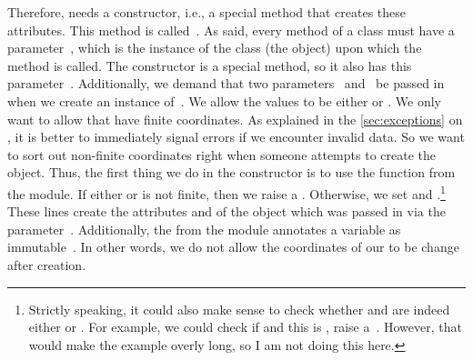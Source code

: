 Therefore,  needs a constructor, i.e., a special method that creates these attributes.
This method is called~.
As said, every method of a class must have a parameter~, which is the instance of the class (the object) upon which the method is called.
The constructor  is a special method, so it also has this parameter~.
Additionally, we demand that two parameters~ and~ be passed in when we create an instance of~.
We allow the values to be either  or .%
%
%
We only want to allow  that have finite coordinates.
As explained in the \cref{sec:exceptions} on , it is better to immediately signal errors if we encounter invalid data.
So we want to sort out non-finite coordinates right when someone attempts to create the  object.
Thus, the first thing we do in the constructor is to use the  function from the  module.
If either  or  is not finite, then we raise a .
Otherwise, we set  and .\footnote{%
Strictly speaking, it could also make sense to check whether  and  are indeed either  or . %
For example, we could check if  and this is , raise a~. %
However, that would make the example overly long, so I am not doing this here.%
}
These lines create the attributes  and  of the object which was passed in via the parameter~.
Additionally, the   from the  module annotates a variable as immutable~\cite{PEP591}.
In other words, we do not allow the coordinates of our  to be change after creation.%
%
%
